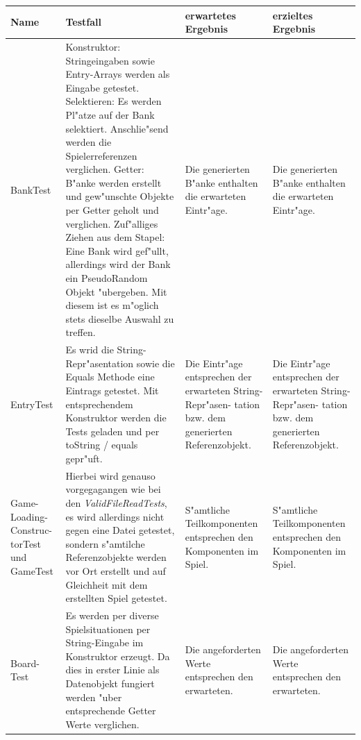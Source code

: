 \begin{longtable}{|p{1.5cm}|p{7.5cm}|p{2cm}|p{2cm}|}
	\hline
	Name & Testfall & erwartetes Ergebnis & erzieltes Ergebnis \\
	\hline

	
	BankTest & 
Konstruktor: Stringeingaben sowie Entry-Arrays werden als Eingabe getestet. 
	\newline Selektieren: Es werden Pl"atze auf der Bank selektiert. Anschlie"send werden die Spielerreferenzen verglichen.
	\newline Getter: B"anke werden erstellt und gew"unschte Objekte per Getter geholt und verglichen.
	\newline Zuf"alliges Ziehen aus dem Stapel: Eine Bank wird gef"ullt, allerdings wird der Bank ein PseudoRandom Objekt "ubergeben. Mit diesem ist es m"oglich stets dieselbe Auswahl zu treffen. 
	& Die generierten B"anke enthalten die erwarteten Eintr"age. 
 	& Die generierten B"anke enthalten die erwarteten Eintr"age. \\
 	
 	\hline 
 	
	EntryTest
	& Es wrid die String-Repr"asentation sowie die Equals Methode eine Eintrags getestet. Mit entsprechendem Konstruktor werden die Tests geladen und per toString / equals gepr"uft. 
	& Die Eintr"age entsprechen der erwarteten String-Repr"asen- \newline tation bzw. dem generierten Referenzobjekt.
	& Die Eintr"age entsprechen der erwarteten String-Repr"asen- \newline tation bzw. dem generierten Referenzobjekt. \\
	
 	\hline 
 	
 	Game- \newline Loading- \newline Construc- \newline torTest und GameTest
 	& Hierbei wird genauso vorgegagangen wie bei den \emph{ValidFileReadTests}, es wird allerdings nicht gegen eine Datei getestet, sondern s"amtilche Referenzobjekte werden vor Ort erstellt und auf Gleichheit mit dem erstellten Spiel getestet. 
 	& S"amtliche Teilkomponenten entsprechen den Komponenten im Spiel. 
 	& S"amtliche Teilkomponenten entsprechen den Komponenten im Spiel. \\
 	
  	\hline 
 	
	Board- \newline Test
	& Es werden per diverse Spielsituationen per String-Eingabe im Konstruktor erzeugt. Da dies in erster Linie als Datenobjekt fungiert werden "uber entsprechende Getter Werte verglichen. 
	& Die angeforderten Werte entsprechen den erwarteten. 
	& Die angeforderten Werte entsprechen den erwarteten. \\
	

\end{longtable}

